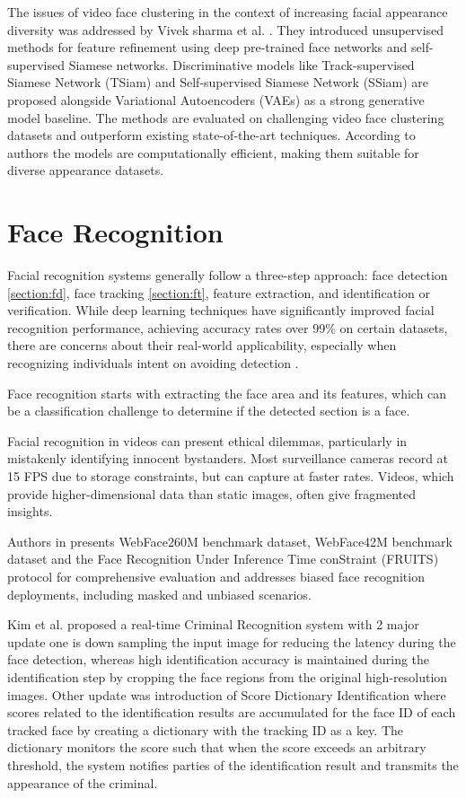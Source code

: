 The issues of video face clustering in the context of increasing facial appearance diversity was addressed by Vivek sharma et al. \cite{sharma_video_2020}. They introduced unsupervised methods for feature refinement using deep pre-trained face networks and self-supervised Siamese networks. Discriminative models like Track-supervised Siamese Network (TSiam) and Self-supervised Siamese Network (SSiam) are proposed alongside Variational Autoencoders (VAEs) as a strong generative model baseline. The methods are evaluated on challenging video face clustering datasets and outperform existing state-of-the-art techniques. According to authors the models are computationally efficient, making them suitable for diverse appearance datasets.

\section{Face Recognition} \label{section:fr}
Facial recognition systems generally follow a three-step approach: face detection \ref{section:fd}, face tracking \ref{section:ft}, feature extraction, and identification or verification. While deep learning techniques have significantly improved facial recognition performance, achieving accuracy rates over 99\% on certain datasets, there are concerns about their real-world applicability, especially when recognizing individuals intent on avoiding detection \cite{kim_surveillance_2023}.

Face recognition starts with extracting the face area and its features, which can be a classification challenge to determine if the detected section is a face.

Facial recognition in videos can present ethical dilemmas, particularly in mistakenly identifying innocent bystanders. Most surveillance cameras record at 15 FPS due to storage constraints, but can capture at faster rates. Videos, which provide higher-dimensional data than static images, often give fragmented insights.

Authors in \cite{zhu_webface260m_2023} presents WebFace260M benchmark dataset, WebFace42M benchmark dataset and the Face Recognition Under Inference Time conStraint (FRUITS) protocol for comprehensive evaluation and addresses biased face recognition deployments, including masked and unbiased scenarios. 

Kim et al. \cite{kim_facial_2023} proposed a real-time Criminal Recognition system with 2 major update one is down sampling the input image for reducing the latency during the face detection, whereas high identification accuracy is maintained during the identification step by cropping the face regions from the original high-resolution images. Other update was introduction of Score Dictionary Identification where scores related to the identification results are accumulated for the face ID of each tracked face by creating a dictionary with the tracking ID as a key. The dictionary monitors the score such that when the score exceeds an arbitrary threshold, the system notifies parties of the identification result and transmits the appearance of the criminal.

